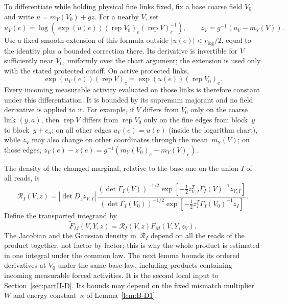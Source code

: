 To differentiate while holding physical fine links fixed, fix a base coarse field $V_0$ and write $u=m_Y(V_0)+gz$. For a nearby $V$, set
\begin{equation*}
u_V(e)=\log\left(\exp(u(e))(\operatorname{rep}V_0)_e(\operatorname{rep}V)_e^{-1}\right),\qquad
z_V=g^{-1}(u_V-m_Y(V)).
\end{equation*}
Use a fixed smooth extension of this formula outside $|u(e)|<r_{\log}/2$, equal to the identity plus a bounded correction there. Its derivative is invertible for $V$ sufficiently near $V_0$, uniformly over the chart argument; the extension is used only with the stated protected cutoff. On active protected links,
\begin{equation*}
\exp(u_V(e))(\operatorname{rep}V)_e=\exp(u(e))(\operatorname{rep}V_0)_e.
\end{equation*}
Every incoming measurable activity evaluated on those links is therefore constant under this differentiation. It is bounded by its supremum majorant and no field derivative is applied to it. For example, if $V$ differs from $V_0$ only on the coarse link $(y,a)$, then $\operatorname{rep}V$ differs from $\operatorname{rep}V_0$ only on the fine edges from block~$y$ to block~$y+e_a$; on all other edges $u_V(e)=u(e)$ (inside the logarithm chart), while $z_V$ may also change on other coordinates through the mean~$m_Y(V)$; on those edges, $z_V(e)-z(e)=g^{-1}(m_Y(V_0)_e-m_Y(V)_e)$.

The density of the changed marginal, relative to the base one on the union $I$ of all reads, is
\begin{equation*}
\mathcal R_I(V,z)=|\det D_z z_{V,I}|\,
\frac{(\det\Gamma_I(V))^{-1/2}\exp[-\tfrac12z_{V,I}^T\Gamma_I(V)^{-1}z_{V,I}]}
{(\det\Gamma_I(V_0))^{-1/2}\exp[-\tfrac12z_I^T\Gamma_I(V_0)^{-1}z_I]}.
\end{equation*}
Define the transported integrand by
\begin{equation*}
\widetilde F_M(V,Y,z)=\mathcal R_I(V,z)F_M(V,Y,z_V).
\end{equation*}
The Jacobian and the Gaussian density in~$\mathcal R_I$ depend on all the reads of the product together, not factor by factor; this is why the whole product is estimated in one integral under the common law.
The next lemma bounds its ordered derivatives at $V_0$ under the same base law, including products containing incoming measurable forced activities. It is the second local input to Section~\ref{sec:partII-D}. Its bounds may depend on the fixed mismatch multiplier~$W$ and energy constant~$\kappa$ of Lemma~\ref{lem:B-D1}.

